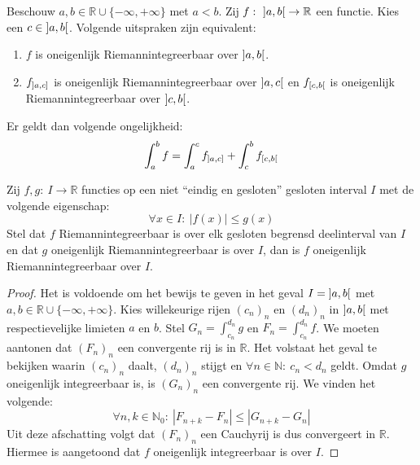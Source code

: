 \documentclass[main.tex]{subfiles}
\begin{document}
\begin{bpr}
  Beschouw $a,b\in \mathbb{R} \cup \{-\infty,+\infty\}$ met $a<b$.
  Zij $f:\ \interval[open]{a}{b} \rightarrow \mathbb{R}$ een functie.
  Kies een $c\in \interval[open]{a}{b}$.
  Volgende uitspraken zijn equivalent:
  \begin{enumerate}
  \item $f$ is oneigenlijk Riemannintegreerbaar over $\interval[open]{a}{b}$.
  \item $f_{\interval[open left]{a}{c}}$ is oneigenlijk Riemannintegreerbaar over $\interval[open]{a}{c}$ en $f_{\interval[open right]{c}{b}}$ is oneigenlijk Riemannintegreerbaar over $\interval[open]{c}{b}$.
  \end{enumerate}
  Er geldt dan volgende ongelijkheid:
  \[ \int_{a}^{b}f = \int_{a}^{c}f_{\interval[open left]{a}{c}} + \int_{c}^{b}f_{\interval[open right]{c}{b}} \]
\end{bpr}

\begin{bst}
  Zij $f,g:\ I \rightarrow \mathbb{R}$ functies op een niet ``eindig en gesloten'' gesloten interval $I$ met de volgende eigenschap:
  \[ \forall x\in I:\ |f(x)| \le g(x) \]
  Stel dat $f$ Riemannintegreerbaar is over elk gesloten begrensd deelinterval van $I$ en dat $g$ oneigenlijk Riemannintegreerbaar is over $I$, dan is $f$ oneigenlijk Riemannintegreerbaar over $I$.

  \begin{proof}
    Het is voldoende om het bewijs te geven in het geval $I = \interval[open]{a}{b}$ met $a,b\in\mathbb{R} \cup \{-\infty,+\infty\}$.\waarom
    Kies willekeurige rijen $(c_{n})_{n}$ en $(d_{n})_{n}$ in $\interval[open]{a}{b}$ met respectievelijke limieten $a$ en $b$.
    Stel $G_{n} = \int_{c_{n}}^{d_{n}}g$ en $F_{n} = \int_{c_{n}}^{d_{n}}f$.
    We moeten aantonen dat $(F_{n})_{n}$ een convergente rij is in $\mathbb{R}$.
    Het volstaat het geval te bekijken waarin $(c_{n})_{n}$ daalt, $(d_{n})_{n}$ stijgt en $\forall n\in\mathbb{N}:\ c_{n}<d_{n}$ geldt.\waarom
    Omdat $g$ oneigenlijk integreerbaar is, is $(G_{n})_{n}$ een convergente rij.
    We vinden het volgende:
    \[ \forall n,k\in\mathbb{N}_{0}:\ |F_{n+k}-F_{n}| \le |G_{n+k}-G_{n}| \]
    Uit deze afschatting volgt dat $(F_{n})_{n}$ een Cauchyrij is dus convergeert in $\mathbb{R}$.
    Hiermee is aangetoond dat $f$ oneigenlijk integreerbaar is over $I$.
  \end{proof}
\end{bst}
\end{document}
